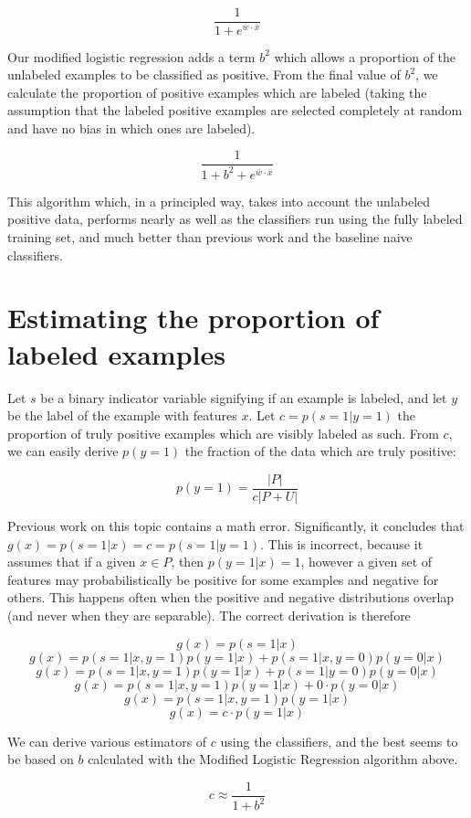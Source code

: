 \documentclass[]{article}
\begin{document}
$$ \frac{1}{1 + e^{\overline{w} \cdot \overline{x}}} $$

Our modified logistic regression adds a term $b^2$ which allows a proportion of the unlabeled examples to be classified as positive. From the final value of $b^2$, we calculate the proportion of positive examples which are labeled (taking the assumption that the labeled positive examples are selected completely at random and have no bias in which ones are labeled).

$$ \frac{1}{1 + b^2 + e^{\overline{w} \cdot \overline{x}}} $$

This algorithm which, in a principled way, takes into account the unlabeled positive data, performs nearly as well as the classifiers run using the fully labeled training set, and much better than previous work and the baseline naive classifiers.

\section{Estimating the proportion of labeled examples}
Let $s$ be a binary indicator variable signifying if an example is labeled, and let $y$ be the label of the example with features $x$. Let $c = p(s=1|y=1)$ the proportion of truly positive examples which are visibly labeled as such. From $c$, we can easily derive $p(y=1)$ the fraction of the data which are truly positive:

$$ p(y=1) = \frac{|P|}{c|P+U|} $$

Previous work on this topic\cite{elkan08} contains a math error.  Significantly, it concludes that $g(x) = p(s=1|x) = c = p(s=1|y=1)$. This is incorrect, because it assumes that if a given $x \in P$, then $p(y=1|x) = 1$, however a given set of features may probabilistically be positive for some examples and negative for others. This happens often when the positive and negative distributions overlap (and never when they are separable). The correct derivation is therefore

$$ g(x) = p(s=1|x) $$ 
$$ g(x) = p(s=1|x,y=1)p(y=1|x) + p(s=1|x,y=0)p(y=0|x)$$
$$ g(x) = p(s=1|x,y=1)p(y=1|x) + p(s=1|y=0)p(y=0|x)$$
$$ g(x) = p(s=1|x,y=1)p(y=1|x) + 0 \cdot p(y=0|x)$$
$$ g(x) = p(s=1|x,y=1)p(y=1|x)$$
$$ g(x) = c \cdot p(y=1|x)$$

We can derive various estimators of $c$ using the classifiers, and the best seems to be based on $b$ calculated with the Modified Logistic Regression algorithm above.

$$c \approx \frac{1}{1 + b^2}$$
\end{document}

